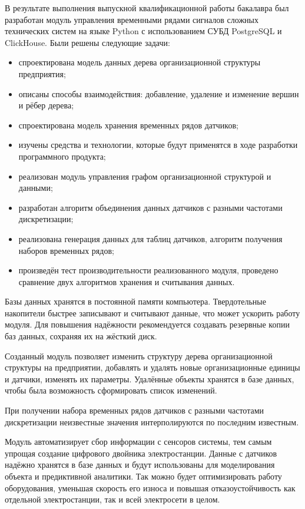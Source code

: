 \conclusion

В результате выполнения выпускной квалификационной работы бакалавра был разработан модуль управления временными рядами сигналов сложных технических систем на языке Python с использованием СУБД PostgreSQL и ClickHouse. Были решены следующие задачи:

\begin{itemize}
    \item спроектирована модель данных дерева организационной структуры предприятия;
    \item описаны способы взаимодействия: добавление, удаление и изменение вершин и рёбер дерева;
    \item спроектирована модель хранения временных рядов датчиков;
    \item изучены средства и технологии, которые будут применятся в ходе разработки программного продукта;
    \item реализован модуль управления графом организационной структурой и данными;
    \item разработан алгоритм объединения данных датчиков с разными частотами дискретизации;
    \item реализована генерация данных для таблиц датчиков, алгоритм получения наборов временных рядов;
    \item произведён тест производительности реализованного модуля, проведено сравнение двух алгоритмов хранения и считывания данных.
\end{itemize}

Базы данных хранятся в постоянной памяти компьютера. Твердотельные накопители быстрее записывают и считывают данные, что может ускорить работу модуля. Для повышения надёжности рекомендуется создавать резервные копии баз данных, сохраняя их на жёсткий диск.

Созданный модуль позволяет изменить структуру дерева организационной структуры на предприятии, добавлять и удалять новые организационные единицы и датчики, изменять их параметры. Удалённые объекты хранятся в базе данных, чтобы была возможность сформировать список изменений.

При получении набора временных рядов датчиков с разными частотами дискретизации неизвестные значения интерполируются по последним известным.

Модуль автоматизирует сбор информации с сенсоров системы, тем самым упрощая создание цифрового двойника электростанции. Данные с датчиков надёжно хранятся в базе данных и будут использованы для моделирования объекта и предиктивной аналитики. Так можно будет оптимизировать работу оборудования, уменьшая скорость его износа и повышая отказоустойчивость как отдельной электростанции, так и всей электросети в целом.

